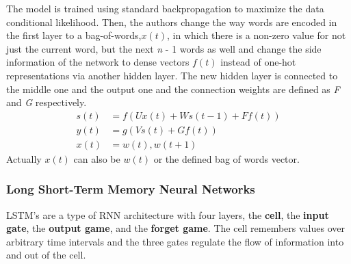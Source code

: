\documentclass{scrartcl}
\begin{document}
    The  model is trained using standard backpropagation to maximize the data 
    conditional likelihood.
    Then, the authors change the way words are encoded in the first layer to a bag-of-words,$x(t)$,
    in which there is a non-zero value for not just the current word, 
    but the next \textit{n} - 1 words as well and change the side information 
    of the network to dense vectors $f(t)$ instead of one-hot representations 
    via another hidden layer. The new hidden layer is connected to the middle one and the 
    output one and the connection weights are defined as \textit{F} and \textit{G} respectively.
    \begin{align*}
        s(t) &= f(Ux(t) + Ws(t-1) + Ff(t)) \\
        y(t) &= g(Vs(t) + Gf(t)) \\
        x(t) &= {w(t), w(t + 1)}
    \end{align*}
    Actually $x(t)$ can also be $w(t)$ or the defined bag of words vector.
   \newpage
   \subsubsection{Long Short-Term Memory Neural Networks}
   LSTM's are a type of RNN architecture with four layers, the \textbf{cell}, 
   the \textbf{input gate}, the \textbf{output game}, and the \textbf{forget game}.
   The cell remembers values over arbitrary time intervals and the three 
   gates regulate the flow of information into and out of the cell. 

    \newpage
    \medskip
    
    
\end{document}
